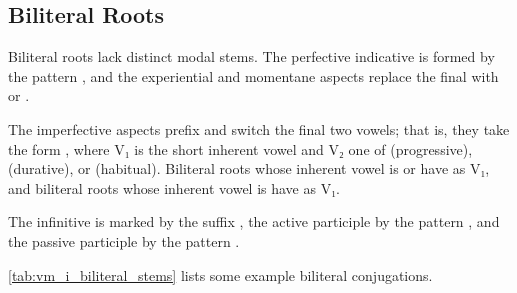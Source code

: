 \documentclass[grammar]{subfiles}
\begin{document}
\subsection{Biliteral Roots}
\label{ssec:vm_i_biliteral}

Biliteral roots lack distinct modal stems.  The perfective indicative is formed
by the pattern , and the experiential and momentane aspects
replace the final  with  or .

The imperfective aspects prefix  and switch the final two vowels;
that is, they take the form , where V₁ is the short
inherent vowel and V₂ one of  (progressive), 
(durative), or  (habitual).  Biliteral roots whose inherent vowel
is  or  have  as V₁, and biliteral roots
whose inherent vowel is  have  as V₁.

The infinitive is marked by the suffix , the active participle by
the pattern , and the passive participle by the pattern
.

\cref{tab:vm_i_biliteral_stems} lists some example biliteral conjugations. 

\begin{table}[h!]\small\capstart
  \centering
  \\
  \caption{Pattern I biliteral stems \label{tab:vm_i_biliteral_stems}}
\end{table}
\end{document}
